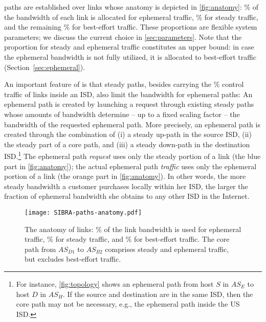 \name paths are established over \name links whose anatomy
is depicted in \autoref{fig:anatomy}: \bweph\% of
the bandwidth of each \name link is allocated for ephemeral traffic, \bwstd\% for
steady traffic, and the remaining \bwbst\% for best-effort traffic.
These proportions are flexible system parameters; we discuss the current choice
in \autoref{sec:parameters}. Note that the proportion for steady and ephemeral
traffic constitutes an upper bound: in case the ephemeral bandwidth is not
fully utilized, it is allocated to best-effort traffic
(Section~\ref{sec:ephemeral}).

An important feature of \name is that steady paths, besides carrying the
\bwstd\% control traffic of links inside an ISD, also limit the bandwidth for ephemeral
paths: An ephemeral path is created by launching a request through existing
steady paths whose amounts of bandwidth determine -- up to a fixed scaling factor
-- the bandwidth of the requested ephemeral path. More precisely, an ephemeral
path is created through the combination of (i) a steady up-path in the source
ISD, (ii) the steady part of a core path, and (iii) a steady down-path in the
destination ISD.\footnote{For instance, \autoref{fig:topology} shows an
ephemeral path from host $S$ in $AS_E$ to host $D$ in $AS_H$. If the source and
destination are in the same ISD, then the core path may not be necessary, e.g.,
the ephemeral path inside the US ISD.} The ephemeral path \emph{request} uses
only the steady portion of a link (the blue part in \autoref{fig:anatomy}); the
actual ephemeral path \emph{traffic} uses only the ephemeral portion of a link
(the orange part in \autoref{fig:anatomy}). In other words, the more steady
bandwidth a customer purchases locally within her ISD, the larger the fraction
of ephemeral bandwidth she obtains to any other ISD in the Internet.


\begin{figure}[t]
  \begin{center}
    \texttt{[image: SIBRA-paths-anatomy.pdf]}
  \end{center}
  \vspace{-3mm}
  \caption{The anatomy of \name links: \bweph\% of the link bandwidth is used
  for ephemeral traffic, \bwstd\% for steady traffic, and \bwbst\% for
  best-effort traffic. The core path from $AS_{D1}$ to $AS_{B2}$ comprises
  steady and ephemeral traffic, but excludes best-effort traffic.}
  \vspace{-7mm}
  \label{fig:anatomy}
\end{figure}


